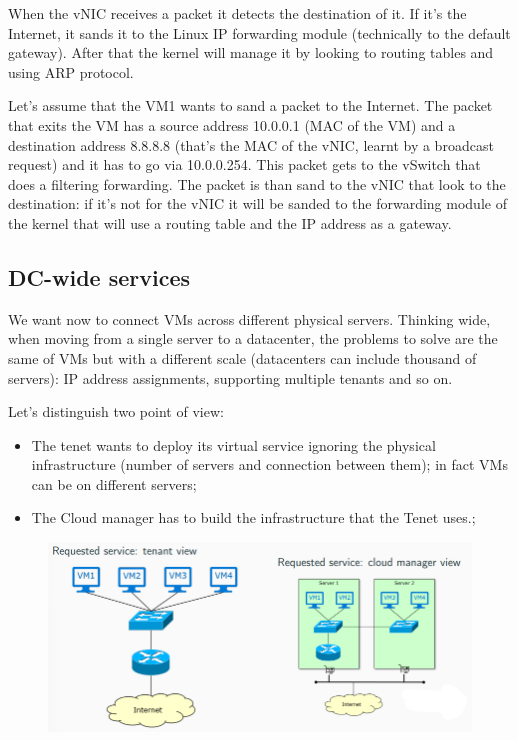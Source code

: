        When the vNIC receives a packet it detects the destination of it. If it's the Internet, it sands it to the Linux IP forwarding module (technically to the default gateway). After that the kernel will manage it by looking to routing tables and using ARP protocol.
        
            Let's assume that the VM1 wants to sand a packet to the Internet. The packet that exits the VM has a source address 10.0.0.1 (MAC of the VM) and a destination address 8.8.8.8 (that's the MAC of the vNIC, learnt by a broadcast request) and it has to go via 10.0.0.254. This packet gets to the vSwitch that does a filtering forwarding. The packet is than sand to the vNIC that look to the destination: if it's not for the vNIC it will be sanded to the forwarding module of the kernel that will use a routing table and the IP address as a gateway.
        
        
    \subsection{DC-wide services}
    
        We want now to connect VMs across different physical servers. Thinking wide, when moving from a single server to a datacenter, the problems to solve are the same of VMs but with a different scale (datacenters can include thousand of servers): IP address assignments, supporting multiple tenants and so on.
        
        \FloatBarrier
        Let's distinguish two point of view:
        \begin{itemize}
            \item The tenet wants to deploy its virtual service ignoring the physical infrastructure (number of servers and connection between them); in fact VMs can be on different servers;
            \item The Cloud manager has to build the infrastructure that the Tenet uses.;
        \end{itemize}
        \begin{figure}[h!]
            \centering
            \includegraphics[scale=0.55]{images/point of views.png}
        \end{figure}
        \FloatBarrier


